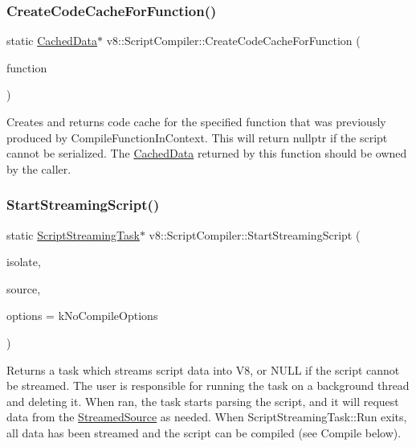 \subsubsection{\texorpdfstring{Create\+Code\+Cache\+For\+Function()}{CreateCodeCacheForFunction()}}
{\footnotesize\ttfamily static \mbox{\hyperlink{structv8_1_1ScriptCompiler_1_1CachedData}{Cached\+Data}}$\ast$ v8\+::\+Script\+Compiler\+::\+Create\+Code\+Cache\+For\+Function (\begin{DoxyParamCaption}\item[{\mbox{\hyperlink{classv8_1_1Local}{Local}}$<$ \mbox{\hyperlink{classv8_1_1Function}{Function}} $>$}]{function }\end{DoxyParamCaption})\hspace{0.3cm}{\ttfamily [static]}}

Creates and returns code cache for the specified function that was previously produced by Compile\+Function\+In\+Context. This will return nullptr if the script cannot be serialized. The \mbox{\hyperlink{structv8_1_1ScriptCompiler_1_1CachedData}{Cached\+Data}} returned by this function should be owned by the caller. \mbox{\label{classv8_1_1ScriptCompiler_a406bb44ef02d644d94bccd3f7b04f2d4}} 
\subsubsection{\texorpdfstring{Start\+Streaming\+Script()}{StartStreamingScript()}}
{\footnotesize\ttfamily static \mbox{\hyperlink{classv8_1_1ScriptCompiler_1_1ScriptStreamingTask}{Script\+Streaming\+Task}}$\ast$ v8\+::\+Script\+Compiler\+::\+Start\+Streaming\+Script (\begin{DoxyParamCaption}\item[{Isolate $\ast$}]{isolate,  }\item[{\mbox{\hyperlink{classv8_1_1ScriptCompiler_1_1StreamedSource}{Streamed\+Source}} $\ast$}]{source,  }\item[{Compile\+Options}]{options = {\ttfamily kNoCompileOptions} }\end{DoxyParamCaption})\hspace{0.3cm}{\ttfamily [static]}}

Returns a task which streams script data into V8, or N\+U\+LL if the script cannot be streamed. The user is responsible for running the task on a background thread and deleting it. When ran, the task starts parsing the script, and it will request data from the \mbox{\hyperlink{classv8_1_1ScriptCompiler_1_1StreamedSource}{Streamed\+Source}} as needed. When Script\+Streaming\+Task\+::\+Run exits, all data has been streamed and the script can be compiled (see Compile below).

